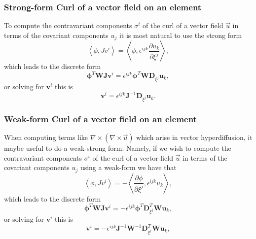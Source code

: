 \documentclass{report}
\newcommand{\inner}[2]{ \left\langle #1, #2 \right\rangle }
\newcommand{\mat}[1]{\boldsymbol #1}
\newcommand{\dvec}[1]{\boldsymbol #1}
\begin{document}
\subsubsection*{Strong-form Curl of a vector field on an element}
To compute the contravariant components $\sigma^i$ of the curl of a vector field
$\vec{u}$ in terms of the covariant components $u_j$ it is most natural to use
the strong form
\begin{equation}
   \inner{\phi}{J v^i} = \inner{\phi}{\epsilon^{ijk} \frac{\partial u_k}{\partial \xi^j}},
\end{equation}
which leads to the discrete form
\begin{equation}
   \dvec{\phi}^{T} \mat{W} \mat{J} \dvec{v}^i = \epsilon^{ijk} \dvec{\phi}^{T} \mat{W} \mat{D}_{\xi^j} \dvec{u}_{k},
\end{equation}
or solving for $\dvec{v}^i$ this is
\begin{equation}
   \dvec{v}^i = \epsilon^{ijk} \mat{J}^{-1} \mat{D}_{\xi^j} \dvec{u}_{k}.
\end{equation}

\subsubsection*{Weak-form Curl of a vector field on an element}
When computing terms like $\nabla \times (\nabla \times \vec{u})$ which arise in
vector hyperdiffusion, it maybe useful to do a weak-strong form. Namely, if we
wish to compute the contravariant components $\sigma^i$ of the curl of a vector
field $\vec{u}$ in terms of the covariant components $u_j$ using a weak-form we
have that
\begin{equation}
   \inner{\phi}{J v^i} =
   -\inner{\frac{\partial \phi}{\partial \xi^j}}{\epsilon^{ijk} u_k},
\end{equation}
which leads to the discrete form
\begin{equation}
   \dvec{\phi}^{T} \mat{W} \mat{J} \dvec{v}^i =
   -\epsilon^{ijk} \dvec{\phi}^{T} \mat{D}_{\xi^j}^{T} \mat{W} \dvec{u}_{k},
\end{equation}
or solving for $\dvec{v}^i$ this is
\begin{equation}
   \dvec{v}^i = -\epsilon^{ijk} \mat{J}^{-1} \mat{W}^{-1} \mat{D}_{\xi^j}^{T} \mat{W} \dvec{u}_{k},
\end{equation}
\end{document}
